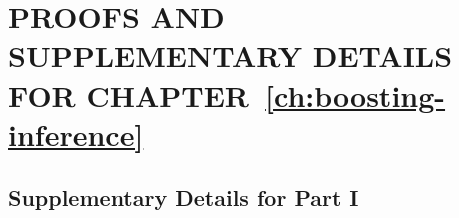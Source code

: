 \chapter{PROOFS AND SUPPLEMENTARY DETAILS FOR CHAPTER~\ref{ch:boosting-inference}}
\label{app:boosting-inference}

\section{Supplementary Details for Part I}
\label{sec:app06-part1}
\label{app:random-projections}
\label{app:finite-sample-convergence}
\label{thm:stochastic-contraction-mapping}
\label{fml:kolmax}
\label{lem:kernelrate}
\label{app:conditional-clt}
\label{lem:locality}
\label{thm:fixed}
\label{app:random-clt}
\label{lem:random}
\label{sec:lemma:random}
\label{lemma:expdecayd}
\label{def:alpha_regular}
\label{lem:rateofP-alpha}
\label{lem:expdecayp}
\label{app:main-theorem}
\label{app:statistics}
\label{thm:komolgorov-extension}
\label{lem:fixtorandom}
\label{app:mse}
\label{fig:additional-mse}
\label{tab:abalone}
\label{tab:automobile}
\label{tab:com-crime}
\label{tab:wine-quality}
\label{tab:student}
\label{tab:obesity}
\label{tab:aids}
\label{tab:temperature}
\label{app:rain-clouds}
\label{fig:moderate-fit}
\label{fig:over-fit}
\label{fig:under-fit}
\label{app:1d-interval}
\label{fig:1d-moderate}
\label{fig:1d-over-fit}
\label{fig:1d-under-fit}


